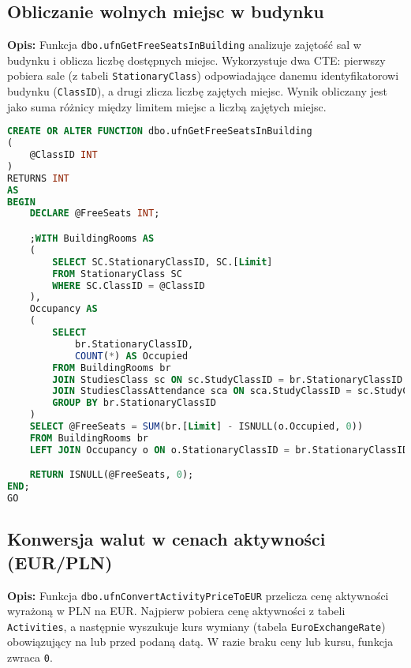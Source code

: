 \documentclass[12pt]{article}
\begin{document}
\newpage
\subsection{Obliczanie wolnych miejsc w budynku}
\label{sec:free_seats_building}

\textbf{Opis:} Funkcja \texttt{dbo.ufnGetFreeSeatsInBuilding} analizuje zajętość sal w budynku i oblicza liczbę dostępnych miejsc. Wykorzystuje dwa CTE: pierwszy pobiera sale (z tabeli \texttt{StationaryClass}) odpowiadające danemu identyfikatorowi budynku (\texttt{ClassID}), a drugi zlicza liczbę zajętych miejsc. Wynik obliczany jest jako suma różnicy między limitem miejsc a liczbą zajętych miejsc.

 
\begin{lstlisting}[language=SQL]
CREATE OR ALTER FUNCTION dbo.ufnGetFreeSeatsInBuilding
(
    @ClassID INT
)
RETURNS INT
AS
BEGIN
    DECLARE @FreeSeats INT;

    ;WITH BuildingRooms AS
    (
        SELECT SC.StationaryClassID, SC.[Limit]
        FROM StationaryClass SC
        WHERE SC.ClassID = @ClassID
    ),
    Occupancy AS
    (
        SELECT
            br.StationaryClassID,
            COUNT(*) AS Occupied
        FROM BuildingRooms br
        JOIN StudiesClass sc ON sc.StudyClassID = br.StationaryClassID 
        JOIN StudiesClassAttendance sca ON sca.StudyClassID = sc.StudyClassID
        GROUP BY br.StationaryClassID
    )
    SELECT @FreeSeats = SUM(br.[Limit] - ISNULL(o.Occupied, 0))
    FROM BuildingRooms br
    LEFT JOIN Occupancy o ON o.StationaryClassID = br.StationaryClassID;

    RETURN ISNULL(@FreeSeats, 0);
END;
GO
\end{lstlisting}
\newpage
\subsection{Konwersja walut w cenach aktywności (EUR/PLN)}
\label{sec:convert_price_eur}

\textbf{Opis:} Funkcja \texttt{dbo.ufnConvertActivityPriceToEUR} przelicza cenę aktywności wyrażoną w PLN na EUR. Najpierw pobiera cenę aktywności z tabeli \texttt{Activities}, a następnie wyszukuje kurs wymiany (tabela \texttt{EuroExchangeRate}) obowiązujący na lub przed podaną datą. W razie braku ceny lub kursu, funkcja zwraca \texttt{0}.
\end{document}
